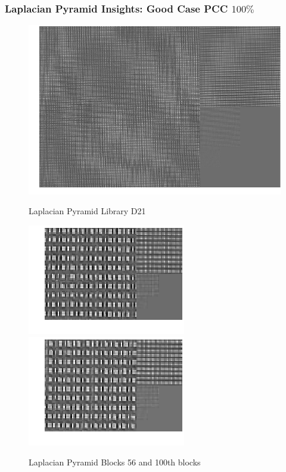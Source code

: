 \documentclass[11pt]{beamer}
\begin{document}
\begin{frame}
\begin{frame}
\frametitle{Laplacian Pyramid Insights: Good Case PCC {$100\%$}}
\begin{figure}
\centering
\includegraphics[height=.3\textheight]{lap_good/lib_k_7_sig_0_85_stat_2.png}\vfill
\caption{Laplacian Pyramid Library D21}
\includegraphics[height=.15\textheight]{lap_good/k_7_sig_0_85_stat_2_blk_56.png}\vfill
\includegraphics[height=.15\textheight]{lap_good/k_7_sig_0_85_stat_2_blk_100.png}
\caption{Laplacian Pyramid Blocks 56 and 100th blocks}
\end{figure}
\end{frame}



\end{frame}
\end{document}
